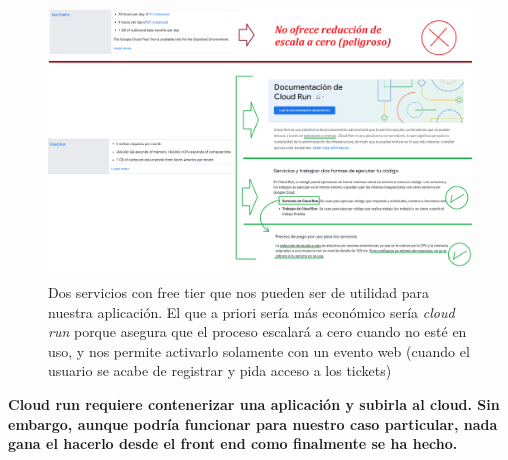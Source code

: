 \documentclass[a4paper,12pt]{report}
\begin{document}
		\FloatBarrier
		\begin{figure}[H]
			\centering
			\caption{Dos servicios con free tier que nos pueden ser de utilidad para nuestra aplicación. El que a priori sería más económico sería \textit{cloud run} porque asegura que el proceso escalará a cero cuando no esté en uso, y nos permite activarlo solamente con un evento web (cuando el usuario se acabe de registrar y pida acceso a los tickets)}
			\label{fig:googleCloud2}
			\includegraphics[width=1\linewidth]{img/googleCloud2.png}
		\end{figure}
		\FloatBarrier
		
	\textbf{Cloud run requiere contenerizar una aplicación y subirla al cloud. Sin embargo, aunque podría funcionar para nuestro caso particular, nada gana el hacerlo desde el front end como finalmente se ha hecho.}
		
		
	
	

	
	
\end{document}
